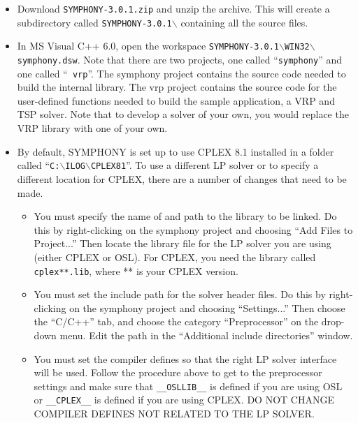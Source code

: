 \begin{itemize}

\item Download {\tt SYMPHONY-3.0.1.zip} and unzip the archive. This will
create a subdirectory called {\tt SYMPHONY-3.0.1$\backslash$} containing all 
the source files.

\item In MS Visual C++ 6.0, open the workspace 
{\tt SYMPHONY-3.0.1$\backslash$WIN32$\backslash$symphony.dsw}.  Note that
there are two projects, one called ``{\tt symphony}'' and one called ``{\tt
vrp}''.  The symphony project contains the source code needed to build the
internal library. The vrp project contains the source code for the
user-defined functions needed to build the sample application, a VRP and TSP
solver. Note that to develop a solver of your own, you would replace the VRP
library with one of your own.

\item By default, SYMPHONY is set up to use CPLEX 8.1 installed in a folder
called ``{\tt C:$\backslash$ILOG$\backslash$CPLEX81}''. To use a different LP 
solver or to specify a different location for CPLEX, there are a number of 
changes that need to be made.

\begin{itemize}

\item You must specify the name of and path to the library to be linked. Do 
this by right-clicking on the symphony project and choosing ``Add Files to
Project...'' Then locate the library file for the LP solver you are using
(either CPLEX or OSL). For CPLEX, you need the library called {\tt
cplex**.lib}, where ** is your CPLEX version.

\item You must set the include path for the solver header files. Do this
by right-clicking on the symphony project and choosing ``Settings...'' Then
choose the ``C/C++'' tab, and choose the category ``Preprocessor'' on the
drop-down menu.  Edit the path in the ``Additional include directories'' 
window.

\item You must set the compiler defines so that the right LP solver interface
will be used. Follow the procedure above to get to the preprocessor settings
and make sure that {\tt \_\_OSLLIB\_\_} is defined if you are using OSL or
{\tt \_\_CPLEX\_\_} is defined if you are using CPLEX. DO NOT CHANGE
COMPILER DEFINES NOT RELATED TO THE LP SOLVER.


\end{itemize}
\end{itemize}
